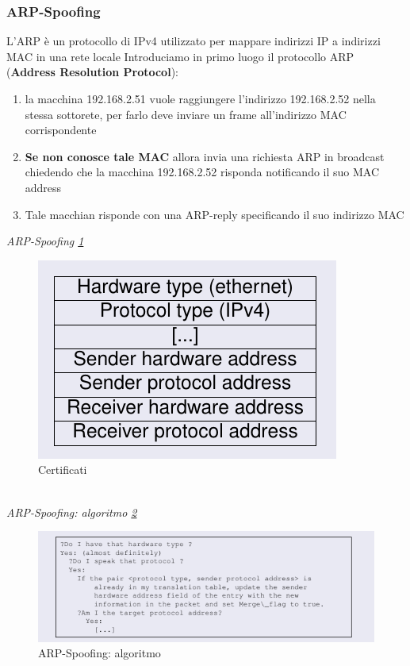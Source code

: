 \documentclass[12pt]{article}
\begin{document}
			\subsubsection{ARP-Spoofing}
				L'ARP è un protocollo di IPv4 utilizzato per mappare indirizzi IP a indirizzi MAC in una rete locale
				Introduciamo in primo luogo il protocollo ARP (\textbf{Address Resolution Protocol}):
				\begin{enumerate}
					\item la macchina 192.168.2.51 vuole raggiungere l'indirizzo 192.168.2.52 nella stessa sottorete, per farlo deve inviare un frame all'indirizzo MAC corrispondente
					\item \textbf{Se non conosce tale MAC} allora invia una richiesta ARP in broadcast chiedendo che la macchina 192.168.2.52 risponda notificando il suo MAC address
					\item Tale macchian risponde con una ARP-reply specificando il suo indirizzo MAC
				\end{enumerate}
				
				\textit{ARP-Spoofing \ref{fig:23}}\\
				\begin{figure}[h!]
					\centering
					\includegraphics[scale=0.60]{img/arp.PNG}
					\caption{Certificati \label{fig:23}}
				\end{figure}\\
				
				\textit{ARP-Spoofing: algoritmo \ref{fig:24}}\\
				\begin{figure}[h!]
					\centering
					\includegraphics[scale=0.60]{img/algoarp.PNG}
					\caption{ARP-Spoofing: algoritmo  \label{fig:24}}
				\end{figure}\\
				
\end{document}
